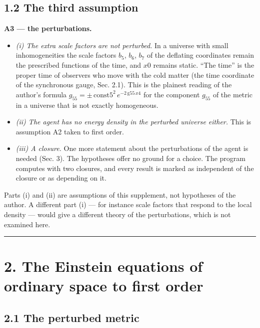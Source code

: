 \documentclass[
  10pt,
]{article}
\providecommand{\tightlist}{%
  \setlength{\itemsep}{0pt}\setlength{\parskip}{0pt}}
\begin{document}
\hypertarget{the-third-assumption}{%
\subsection{1.2 The third assumption}\label{the-third-assumption}}

\textbf{A3 --- the perturbations.}

\begin{itemize}
\tightlist
\item
  \emph{(i) The extra scale factors are not perturbed.} In a universe
  with small inhomogeneities the scale factors \(b_5\), \(b_6\), \(b_7\)
  of the deflating coordinates remain the prescribed functions of the
  time, and \(x0\) remains static. ``The time'' is the proper time of
  observers who move with the cold matter (the time coordinate of the
  synchronous gauge, Sec. 2.1). This is the plainest reading of the
  author's formula
  \(g_{55}=\pm\,\mathrm{const5}^2\,e^{-2\,\mathrm{g55}\,x4}\) for the
  component \(g_{55}\) of the metric in a universe that is not exactly
  homogeneous.
\item
  \emph{(ii) The agent has no energy density in the perturbed universe
  either.} This is assumption A2 taken to first order.
\item
  \emph{(iii) A closure.} One more statement about the perturbations of
  the agent is needed (Sec. 3). The hypotheses offer no ground for a
  choice. The program computes with two closures, and every result is
  marked as independent of the closure or as depending on it.
\end{itemize}

Parts (i) and (ii) are assumptions of this supplement, not hypotheses of
the author. A different part (i) --- for instance scale factors that
respond to the local density --- would give a different theory of the
perturbations, which is not examined here.

\begin{center}\rule{0.5\linewidth}{0.5pt}\end{center}

\hypertarget{the-einstein-equations-of-ordinary-space-to-first-order}{%
\section{2. The Einstein equations of ordinary space to first
order}\label{the-einstein-equations-of-ordinary-space-to-first-order}}

\hypertarget{the-perturbed-metric}{%
\subsection{2.1 The perturbed metric}\label{the-perturbed-metric}}
\end{document}
